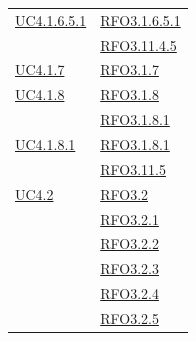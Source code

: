 \begin{longtable}{|>{\centering}m{5cm}|m{5cm}<{\centering}|}
\hyperref[UC4.1.6.5.1]{UC4.1.6.5.1} & \hyperlink{RFO3.1.6.5.1}{RFO3.1.6.5.1}\\ & \hyperlink{RFO3.11.4.5}{RFO3.11.4.5}\\ \hline
\hyperref[UC4.1.7]{UC4.1.7} & \hyperlink{RFO3.1.7}{RFO3.1.7}\\ \hline
\hyperref[UC4.1.8]{UC4.1.8} & \hyperlink{RFO3.1.8}{RFO3.1.8}\\
& \hyperlink{RFO3.1.8.1}{RFO3.1.8.1}\\ \hline
\hyperref[UC4.1.8.1]{UC4.1.8.1} & \hyperlink{RFO3.1.8.1}{RFO3.1.8.1}\\
& \hyperlink{RFO3.11.5}{RFO3.11.5}\\ \hline

\hyperref[UC4.2]{UC4.2} & \hyperlink{RFO3.2}{RFO3.2}\\
& \hyperlink{RFO3.2.1}{RFO3.2.1}\\
& \hyperlink{RFO3.2.2}{RFO3.2.2}\\
& \hyperlink{RFO3.2.3}{RFO3.2.3}\\
& \hyperlink{RFO3.2.4}{RFO3.2.4}\\
& \hyperlink{RFO3.2.5}{RFO3.2.5}\\


\end{longtable}
